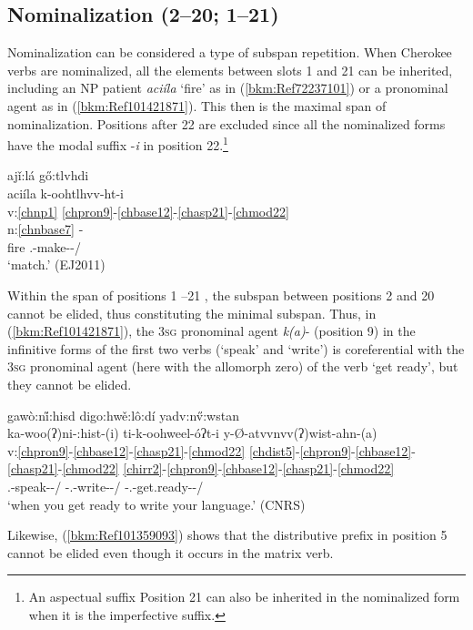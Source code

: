 \documentclass[output=paper]{langscibook}
\begin{document}
\subsection{Nominalization (2--20; 1--21)}
\label{bkm:Ref87350422}
Nominalization can be considered a type of subspan repetition. When Cherokee verbs are nominalized, all the elements between slots 1 and 21 can be inherited, including an NP patient \textit{aciíla} `fire' as in (\ref{bkm:Ref72237101}) or a pronominal agent as in (\ref{bkm:Ref101421871}). This then is the maximal span of nominalization. Positions after 22 are excluded since all the nominalized forms have the modal suffix -\textit{i} in position 22.\footnote{An aspectual suffix Position 21 can also be inherited in the nominalized form when it is the imperfective suffix.} 

\ea\label{bkm:Ref72237101}ajǐ:lá g\H{o}:tlvhdi \\
\gllll aciíla k-oohtlhvv-ht-i\\
v:\ref{chnp1} \ref{chpron9}-\ref{chbase12}-\ref{chasp21}-\ref{chmod22}\\
n:\ref{chnbase7} - \\ 
fire \Third\Sg.\Aarg{}-make-\Inf{}-\Nom/\Sh{}\\
\glt `match.' (EJ2011)
\z 


Within the span of positions 1 –21 , the subspan between positions 2 and 20 cannot be elided, thus constituting the minimal subspan. Thus, in (\ref{bkm:Ref101421871}), the 3\textsc{sg} pronominal agent \textit{k(a)}- (position 9) in the infinitive forms of the first two verbs (`speak' and `write') is coreferential with the 3\textsc{sg} pronominal agent (here with the allomorph zero) of the verb `get ready', but they cannot be elided.

\ea\label{bkm:Ref101421871}gawò:n\H{i}:hisd digo:hwě:lô:dí yadv:n\H{v}:wstan \\
\glll ka-woo(ʔ)ni-:hist-(i) ti-k-oohweel-óʔt-i y-Ø-atvvnvv(ʔ)wist-ahn-(a)\\
v:\ref{chpron9}-\ref{chbase12}-\ref{chasp21}-\ref{chmod22} \ref{chdist5}-\ref{chpron9}-\ref{chbase12}-\ref{chasp21}-\ref{chmod22} \ref{chirr2}-\ref{chpron9}-\ref{chbase12}-\ref{chasp21}-\ref{chmod22}\\
\Third\Sg.\Aarg{}-speak-\Inf{}-\Nom/\Sh{} \Dist-\Third\Sg.\Aarg{}-write-\Inf{}-\Nom/\Sh{} \Irr{}-\Third\Sg.\Aarg{}-get.ready-\Prf{}-\Ind/\Sh{}\\
\glt `when you get ready to write your language.' (CNRS)
\z 

Likewise, (\ref{bkm:Ref101359093}) shows that the distributive prefix in position 5 cannot be elided even though it occurs in the matrix verb.
\end{document}
